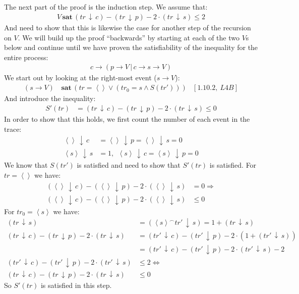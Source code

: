 \documentclass[11pt,a4paper]{article}
\def\ra{\rightarrow}
\def\ch{\,|\,}
\def\cat{^{\frown}}
\def\count{\,\downarrow\,}
\def\sat{\,\textbf{sat}\,}
\newcommand{\ab}[1]{\left \langle #1 \right \rangle}
\begin{document}
The next part of the proof is the induction step. We assume that:
\begin{align*}
    V \sat (tr \count c) - (tr \count p) - 2 \cdot (tr \count s) \leq 2 
\end{align*}
And need to show that this is likewise the case for another step of the
recursion on $V$. We will build up the proof ``backwards'' by starting at each
of the two $V$s below and continue until we have proven the satisfiability of
the inequality for the entire process:
\begin{align*}
    c \ra (p \ra V \ch c \ra s \ra V)
\end{align*}
We start out by looking at the right-most event ($s \ra V$):
\begin{align*}
    (s \ra V) &\sat (tr = \ab{ } \lor (tr_0 = s \land S(tr'))) & [1.10.2,~L4B]
\end{align*}
And introduce the inequality:
\begin{align*}
    S'(tr) &= (tr \count c) - (tr \count p) - 2 \cdot (tr \count s) \leq 0
\end{align*}
In order to show that this holds, we first count the number of each event in the
trace:
\begin{align*}
    \ab{} \count c &= \ab{} \count p = \ab{} \count s = 0 \\
    \ab{s} \count s &= 1,~~ \ab{s} \count c = \ab{s} \count p = 0
\end{align*}
We know that $S(tr')$ is satisfied and need to show that $S'(tr)$ is satisfied.
For $tr = \ab{}$ we have:
\begin{align*}
    (\ab{ } \count c) - (\ab{ } \count p) - 2 \cdot (\ab{ } \count s) &= 0
    \Rightarrow \\
    (\ab{ } \count c) - (\ab{ } \count p) - 2 \cdot (\ab{ } \count s) &\leq 0
\end{align*}
For $tr_0 = \ab{s}$ we have: 
\begin{align*}
    (tr \count s) &= (\ab{s} \cat tr' \count s) = 1 + (tr \count s) \\
    (tr \count c) - (tr \count p) - 2 \cdot (tr \count s) &=
        (tr' \count c) - (tr' \count p) - 2 \cdot (1+(tr' \count s))\\
        &= (tr' \count c) - (tr' \count p) - 2 \cdot (tr' \count s)-2\\
    (tr' \count c) - (tr' \count p) - 2 \cdot (tr' \count s) &\leq 2
        \Leftrightarrow \\
        (tr \count c) - (tr \count p) - 2 \cdot (tr \count s) &\leq 0
\end{align*}
So $S'(tr)$ is satisfied in this step.
\end{document}
